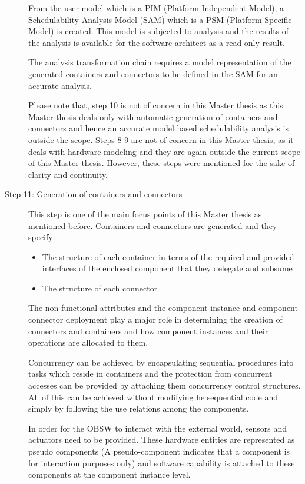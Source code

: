 \begin{description}
From the user model which is a PIM (Platform Independent Model), a Schedulability Analysis Model (SAM) which is a PSM (Platform Specific Model) is created. This model is subjected to analysis and the results of the analysis is available for the software architect as a read-only result. 

The analysis transformation chain requires a model representation of the generated containers and connectors to be defined in the SAM for an accurate analysis.

Please note that, step 10 is not of concern in this Master thesis as this Master thesis deals only with automatic generation of containers and connectors and hence an accurate model based schedulability analysis is outside the scope. Steps 8-9 are not of concern in this Master thesis, as it deals with hardware modeling and they are again outside the current scope of this Master thesis. However, these steps were mentioned for the sake of clarity and continuity.

\item [Step 11: Generation of containers and connectors]  This step is one of the main focus points of this Master thesis as mentioned before. Containers and connectors are generated and they specify:
\begin{itemize}
\item The structure of each container in terms of the required and provided interfaces of the enclosed component that they delegate and subsume
\item The structure of each connector 
\end{itemize} 
The non-functional attributes and the component instance and component connector deployment play a major role in determining the creation of connectors and containers and how component instances and their operations are allocated to them.

Concurrency can be achieved by encapsulating sequential procedures into tasks which reside in containers and the protection from concurrent accesses can be provided by attaching them concurrency control structures. All of this can be achieved without modifying he sequential code and simply by following the use relations among the components.

In order for the OBSW to interact with the external world, sensors and actuators need to be provided. These hardware entities are represented as pseudo components (A pseudo-component indicates that a component is for interaction purposes only) and software capability is attached to these components at the component instance level.    
\end{description}


